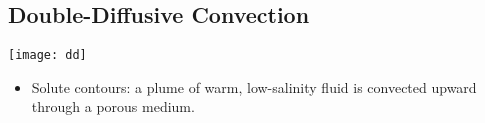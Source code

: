 \subsection*{Double-Diffusive Convection}
\begin{frame}[t]
  \begin{center}
    \texttt{[image: dd]}    
  \end{center}

  \begin{block}{}
    \begin{itemize}
    \item{Solute contours: a plume of
      warm, low-salinity fluid is convected upward through a porous medium.
      }
      \end{itemize}
  \end{block}
\end{frame}


